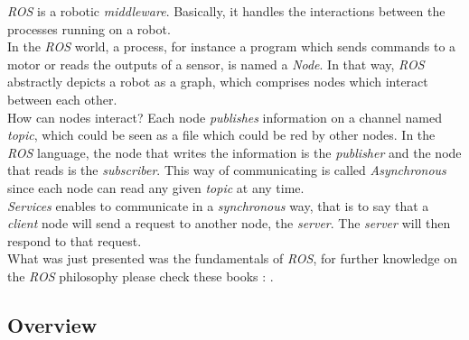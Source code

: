 			\textit{ROS} is a robotic \textit{middleware}. Basically, it
			handles the interactions between the processes
			running on a robot.
			\\\indent In the \textit{ROS} world, a process, for 
			instance a program which sends commands to a motor or reads the 
			outputs of a sensor, is named a \textit{Node}. In that way, 
			\textit{ROS} abstractly depicts a robot as a graph, which 
			comprises nodes which interact between each other.
			\\\indent How can nodes interact? Each node \textit{publishes}
			information on a channel named \textit{topic}, which could 
			be seen as a file which could be red by other nodes.
			In the \textit{ROS} language, the node that 
			writes the information is the \textit{publisher}
			and the node that reads is the \textit{subscriber}.
			This way 
			of communicating is called \textit{Asynchronous} since 
			each node can read any given \textit{topic} at any time.
			\\\indent \textit{Services} enables to communicate in  a
			\textit{synchronous} way, that is to say that 
			a \textit{client} node will send a request to another node,
			the \textit{server}. The \textit{server} will then respond to 
			that request. 
			\\\indent What was just presented 
			was the fundamentals of \textit{ROS},
			for further knowledge on the \textit{ROS}
			philosophy please check these books : \cite{rosprojects,ros,buildingrobot, rosbyexample} .
			
		\subsection{Overview}
		
